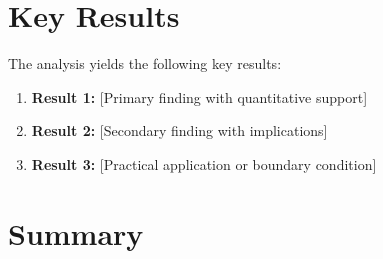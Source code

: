 
\section{Key Results}
\label{sec:fnd-results}

The analysis yields the following key results:

\begin{enumerate}
    \item \textbf{Result 1:} [Primary finding with quantitative support]
    \item \textbf{Result 2:} [Secondary finding with implications]
    \item \textbf{Result 3:} [Practical application or boundary condition]
\end{enumerate}


\section{Summary}
\label{sec:summary}

